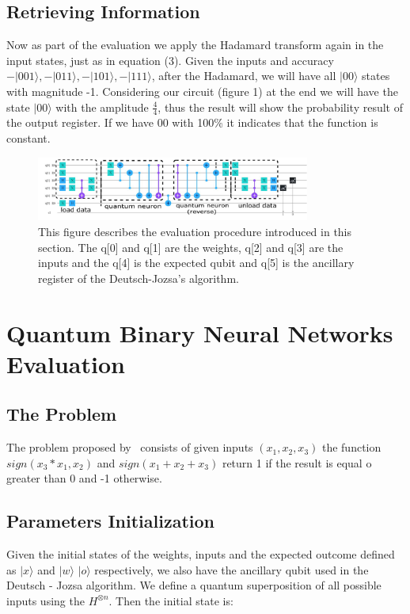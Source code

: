 \documentclass[conference]{IEEEtran}
\begin{document}
\subsection{Retrieving Information}\label{subsec:neuron-evaluation}

Now as part of the evaluation we apply the Hadamard transform again in the input states, just as in equation (3).
Given the inputs and accuracy \(-|001\rangle, -|011\rangle, - |101\rangle, -|111\rangle\), after the Hadamard, we will have
all \(|00\rangle\) states with magnitude -1.
Considering our circuit (figure 1) at the end we will have the state \(|00\rangle\) with the amplitude \(\frac{4}{4}\),
thus the result will show the probability result of the output register.
If we have 00 with 100\% it indicates that the function is constant.

\begin{figure}[h!]
    \centering
    \includegraphics[width=9cm, scale=0.5]{images/circuit.pdf}
    \caption{This figure describes the evaluation procedure introduced in this section.
    The q[0] and q[1] are the weights, q[2] and q[3] are the inputs and the q[4] is the expected qubit
    and q[5] is the ancillary register of the Deutsch-Jozsa's algorithm.}\label{Fig:MV}
\end{figure}

\section{Quantum Binary Neural Networks Evaluation}\label{sec:quantum-binary-neural-networks-evaluation}

\subsection*{The Problem}\label{subsec:the-problem2}
 The problem proposed by~\cite{fawaz2019training} consists of given inputs \((x_1, x_2, x_3)\) the function
  \(sign(x_3*x_1, x_2)\) and \(sign(x_1 + x_2 + x_3)\) return 1 if the result is equal o greater than 0 and -1 otherwise.

 \subsection{Parameters Initialization}\label{subsec:initializaton}
   Given the initial states of the weights, inputs and the expected outcome defined as $|x\rangle$ and $|w\rangle$
 $|o\rangle$ respectively, we also have the ancillary qubit used in the Deutsch - Jozsa algorithm.
 We define a quantum superposition of all possible inputs using the $H^ {\otimes n}$.
 Then the initial state is:
\end{document}
